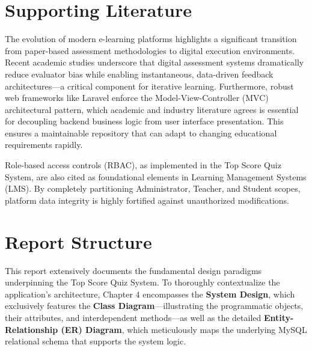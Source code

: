 \section{Supporting Literature}

The evolution of modern e-learning platforms highlights a significant transition from paper-based assessment methodologies to digital execution environments. Recent academic studies underscore that digital assessment systems dramatically reduce evaluator bias while enabling instantaneous, data-driven feedback architectures—a critical component for iterative learning. Furthermore, robust web frameworks like Laravel enforce the Model-View-Controller (MVC) architectural pattern, which academic and industry literature agrees is essential for decoupling backend business logic from user interface presentation. This ensures a maintainable repository that can adapt to changing educational requirements rapidly.

Role-based access controls (RBAC), as implemented in the Top Score Quiz System, are also cited as foundational elements in Learning Management Systems (LMS). By completely partitioning Administrator, Teacher, and Student scopes, platform data integrity is highly fortified against unauthorized modifications.

\section{Report Structure}

This report extensively documents the fundamental design paradigms underpinning the Top Score Quiz System. To thoroughly contextualize the application's architecture, Chapter 4 encompasses the \textbf{System Design}, which exclusively features the \textbf{Class Diagram}—illustrating the programmatic objects, their attributes, and interdependent methods—as well as the detailed \textbf{Entity-Relationship (ER) Diagram}, which meticulously maps the underlying MySQL relational schema that supports the system logic.
